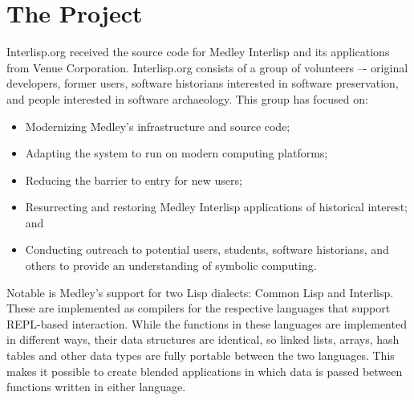 \documentclass[sigconf]{acmart}
\begin{document}
\section{The Project}

Interlisp.org received the source code for Medley Interlisp and its applications from Venue Corporation. Interlisp.org consists of a group of volunteers –- original developers, former users, software historians interested in software preservation, and people interested in software archaeology. This group has focused on:

\begin{itemize}
  \item Modernizing Medley's infrastructure and source code;

  \item Adapting the system to run on modern computing platforms;

  \item Reducing the barrier to entry for new users; 

  \item Resurrecting and restoring Medley Interlisp applications of historical interest; and

  \item Conducting outreach to potential users, students, software historians, and others to provide an understanding of symbolic computing.
\end{itemize}

Notable is Medley's support for two Lisp dialects: Common Lisp and Interlisp. These are implemented as compilers for the respective languages that support REPL-based interaction. While the functions in these languages are implemented in different ways, their data structures are identical, so linked lists, arrays, hash tables and other data types are fully portable between the two languages. This makes it possible to create blended applications in which data is passed between functions written in either language.




\end{document}
